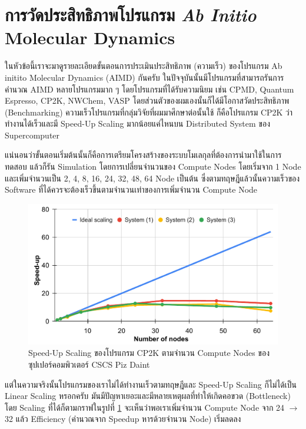 \section{การวัดประสิทธิภาพโปรแกรม \textit{Ab Initio} Molecular Dynamics}

ในหัวข้อนี้เราจะมาดูรายละเอียดขั้นตอนการประเมินประสิทธิภาพ (ความเร็ว) ของโปรแกรม Ab initito Molecular Dynamics (AIMD) กันครับ
ในปัจจุบันนั้นมีโปรแกรมที่สามารถรันการคำนวณ AIMD หลายโปรแกรมมาก ๆ โดยโปรแกรมที่ได้รับความนิยม เช่น CPMD, Quantum Espresso,
CP2K, NWChem, VASP โดยส่วนตัวของผมเองนั้นก็ได้มีโอกาสวัดประสิทธิภาพ (Benchmarking) ความเร็วโปรแกรมที่กลุ่มวิจัยที่ผมมาศึกษาต่อนั้นใช้
ก็คือโปรแกรม CP2K ว่าทำงานได้เร็วและมี Speed-Up Scaling มากน้อยแค่ไหนบน Distributed System ของ Supercomputer

แน่นอนว่าขั้นตอนเริ่มต้นนั้นก็คือการเตรียมโครงสร้างของระบบโมเลกุลที่ต้องการนำมาใช้ในการทดสอบ แล้วก็รัน Simulation โดยการเปลี่ยนจำนวนของ
Compute Nodes โดยเริ่มจาก 1 Node และเพิ่มจำนวนเป็น 2, 4, 8, 16, 24, 32, 48, 64 Node เป็นต้น ซึ่งตามทฤษฎีแล้วนั้นความเร็วของ
Software ที่ได้ควรจะต้องเร็วขึ้นตามจำนวนเท่าของการเพิ่มจำนวน Compute Node

\begin{figure}[htbp]
  \centering
  \includegraphics[width=0.9\linewidth]{fig/perf-scaling-cp2k.pdf}
  \caption{Speed-Up Scaling ของโปรแกรม CP2K ตามจำนวน Compute Nodes ของซุปเปอร์คอมพิวเตอร์ CSCS Piz Daint}
  \label{fig:perf_scaling_cp2k}
\end{figure}

แต่ในความจริงนั้นโปรแกรมของเราไม่ได้ทำงานเร็วตามทฤษฎีและ Speed-Up Scaling ก็ไม่ได้เป็น Linear Scaling หรอกครับ
มันมีปัญหาเยอะและมีหลายเหตุผลที่ทำให้เกิดคอขวด (Bottleneck) โดย Scaling ที่ได้ก็ตามกราฟในรูปที่ \ref{fig:perf_scaling_cp2k}
จะเห็นว่าพอเราเพิ่มจำนวน Compute Node จาก 24 $\rightarrow$ 32 แล้ว Efficiency (คำนวณจาก Speedup หารด้วยจำนวน Node)
เริ่มลดลง

